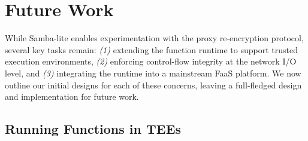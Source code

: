 \section{Future Work}
\label{sec:future}

While Samba-lite enables experimentation with the proxy re-encryption protocol,
several key tasks remain: \emph{(1)} extending the function runtime to support
trusted execution environments, \emph{(2)} enforcing control-flow integrity at
the network I/O level, and \emph{(3)} integrating the runtime into a mainstream
FaaS platform.
%
We now outline our initial designs for each of these concerns, leaving a
full-fledged design and implementation for future work.


\subsection{Running Functions in TEEs}

